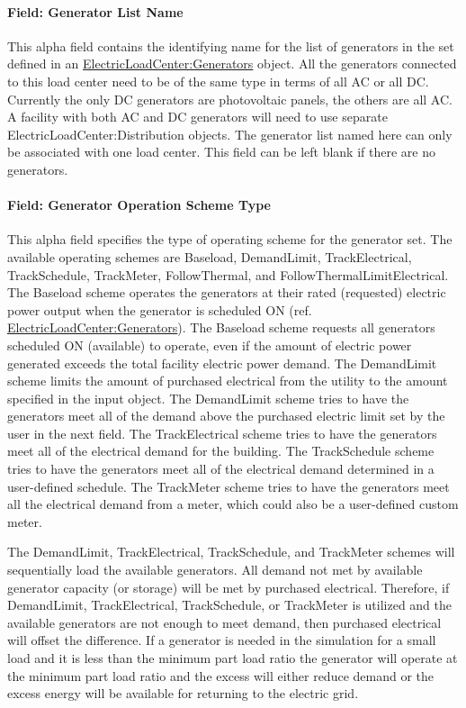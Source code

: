 \paragraph{Field: Generator List Name}\label{field-generator-list-name}

This alpha field contains the identifying name for the list of generators in the set defined in an \hyperref[electricloadcentergenerators]{ElectricLoadCenter:Generators} object. All the generators connected to this load center need to be of the same type in terms of all AC or all DC. Currently the only DC generators are photovoltaic panels, the others are all AC. A facility with both AC and DC generators will need to use separate ElectricLoadCenter:Distribution objects. The generator list named here can only be associated with one load center. This field can be left blank if there are no generators.

\paragraph{Field: Generator Operation Scheme Type}\label{field-generator-operation-scheme-type}

This alpha field specifies the type of operating scheme for the generator set. The available operating schemes are Baseload, DemandLimit, TrackElectrical, TrackSchedule, TrackMeter, FollowThermal, and FollowThermalLimitElectrical. The Baseload scheme operates the generators at their rated (requested) electric power output when the generator is scheduled ON (ref. \hyperref[electricloadcentergenerators]{ElectricLoadCenter:Generators}). The Baseload scheme requests all generators scheduled ON (available) to operate, even if the amount of electric power generated exceeds the total facility electric power demand. The DemandLimit scheme limits the amount of purchased electrical from the utility to the amount specified in the input object. The DemandLimit scheme tries to have the generators meet all of the demand above the purchased electric limit set by the user in the next field. The TrackElectrical scheme tries to have the generators meet all of the electrical demand for the building. The TrackSchedule scheme tries to have the generators meet all of the electrical demand determined in a user-defined schedule. The TrackMeter scheme tries to have the generators meet all the electrical demand from a meter, which could also be a user-defined custom meter.

The DemandLimit, TrackElectrical, TrackSchedule, and TrackMeter schemes will sequentially load the available generators. All demand not met by available generator capacity (or storage) will be met by purchased electrical. Therefore, if DemandLimit, TrackElectrical, TrackSchedule, or TrackMeter is utilized and the available generators are not enough to meet demand, then purchased electrical will offset the difference. If a generator is needed in the simulation for a small load and it is less than the minimum part load ratio the generator will operate at the minimum part load ratio and the excess will either reduce demand or the excess energy will be available for returning to the electric grid.

